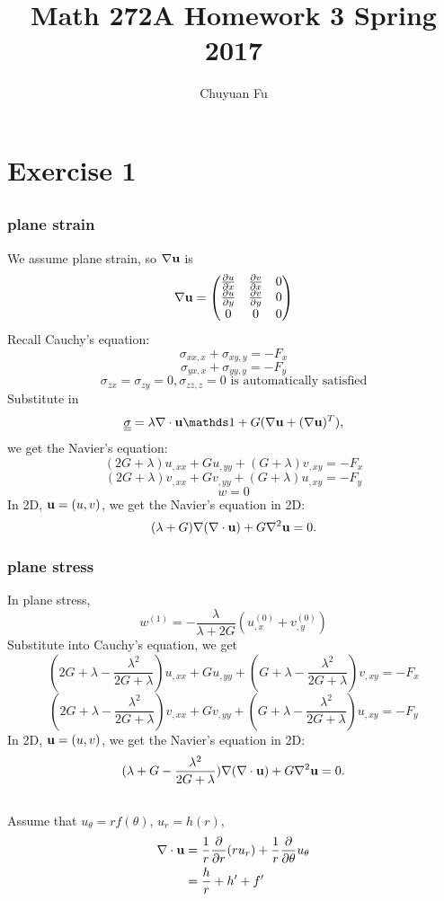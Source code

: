 \documentclass[12pt]{article}
\newcommand{\uu}{{\bf u}}
\newcommand{\bnabla}{{\bf \nabla}}
\newcommand{\ssigma}{{\underline{\underline \sigma}}}
\newcommand{\pr}{{\partial}}
\newcommand{\mx}[1]{\begin{pmatrix}#1\end{pmatrix}}
\begin{document}
\title{Math 272A Homework 3 Spring 2017}
\author{Chuyuan Fu}
\date{}

\maketitle

\section{Exercise 1}
\subsection{}
\subsubsection{plane strain}
We assume plane strain, so $\bnabla\uu$ is
\[
\bnabla \uu = \mx{\frac{\pr u}{\pr x} &\frac{\pr v}{\pr x} & 0\\
  \frac{\pr u}{\pr y} &\frac{\pr v}{\pr y} & 0\\
  0 & 0 &0
}
\]
Recall Cauchy's equation:
\[
\sigma_{xx,x} + \sigma_{xy,y} = -F_x
\]
\[
\sigma_{yx,x} + \sigma_{yy,y} = -F_y
\]
\[
\sigma_{zx} = \sigma_{zy} = 0, \sigma_{zz,z} = 0 \text{ is automatically satisfied}
\]
Substitute in
\[
\ssigma = \lambda \bnabla\cdot\uu {\mathds 1} + G(\nabla \uu +(\nabla \uu)^T), 
\]
we get the Navier's equation: 
\[
(2G + \lambda)u_{,xx} + Gu_{,yy} + (G+\lambda)v_{,xy} = -F_x
\]
\[
(2G + \lambda)v_{,xx} + Gv_{,yy} + (G+\lambda )u_{,xy} = -F_y
\]
\[
w=0
\]
In 2D,  $\uu = (u,v)$, we get the Navier's equation in 2D:
\[
(\lambda + G)\nabla(\nabla\cdot\uu) + G \nabla^2\uu=0.
\]


\subsubsection{plane stress}
In plane stress,
\[
w^{(1)} = -\frac{\lambda}{\lambda + 2G}(u_{,x}^{(0)} + v_{,y}^{(0)})
\]
Substitute into Cauchy's equation, we get
\[
(2G + \lambda - \frac{\lambda^2}{2G+\lambda})u_{,xx} + Gu_{,yy} + (G+\lambda - \frac{\lambda^2}{2G+\lambda})v_{,xy} = -F_x
\]
\[
(2G + \lambda- \frac{\lambda^2}{2G+\lambda})v_{,xx} + Gv_{,yy} + (G+\lambda- \frac{\lambda^2}{2G+\lambda})u_{,xy} = -F_y
\]
In 2D,  $\uu = (u,v)$, we get the Navier's equation in 2D:
\[
(\lambda + G- \frac{\lambda^2}{2G+\lambda})\nabla(\nabla\cdot\uu) + G \nabla^2\uu=0.
\]


\subsection{}
Assume that $u_{\theta} = rf(\theta)$, $u_r = h(r)$,
\begin{align*}
  \nabla \cdot\uu &= \frac 1 r \frac{\pr}{\pr r} (ru_r) + \frac 1 r \frac{\pr}{\pr \theta}u_{\theta} \\
  &=\frac h r + h' + f'
\end{align*}
\end{document}
